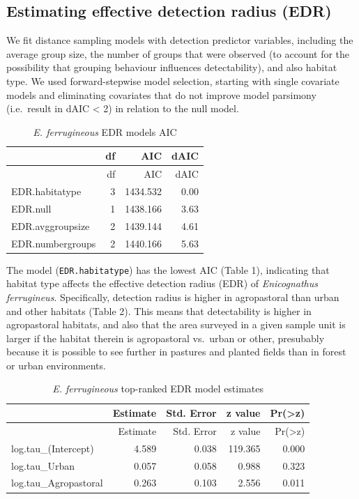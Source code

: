 \documentclass[]{article}
\begin{document}
\subsection{Estimating effective detection radius
(EDR)}\label{estimating-effective-detection-radius-edr}

We fit distance sampling models with detection predictor variables,
including the average group size, the number of groups that were
observed (to account for the possibility that grouping behaviour
influences detectability), and also habitat type. We used
forward-stepwise model selection, starting with single covariate models
and eliminating covariates that do not improve model parsimony
(i.e.~result in dAIC \textless{} 2) in relation to the null model.

\begin{longtable}[]{@{}lrrr@{}}
\caption{\textit{E. ferrugineous} EDR models AIC}\tabularnewline
\toprule
& df & AIC & dAIC\tabularnewline
\midrule
\endfirsthead
\toprule
& df & AIC & dAIC\tabularnewline
\midrule
\endhead
EDR.habitatype & 3 & 1434.532 & 0.00\tabularnewline
EDR.null & 1 & 1438.166 & 3.63\tabularnewline
EDR.avggroupsize & 2 & 1439.144 & 4.61\tabularnewline
EDR.numbergroups & 2 & 1440.166 & 5.63\tabularnewline
\bottomrule
\end{longtable}

The model (\texttt{EDR.habitatype}) has the lowest AIC (Table 1),
indicating that habitat type affects the effective detection radius
(EDR) of \emph{Enicognathus ferrugineus}. Specifically, detection radius
is higher in agropastoral than urban and other habitats (Table 2). This
means that detectability is higher in agropastoral habitats, and also
that the area surveyed in a given sample unit is larger if the habitat
therein is agropastoral vs.~urban or other, presubably because it is
possible to see further in pastures and planted fields than in forest or
urban environments.

\begin{longtable}[]{@{}lrrrr@{}}
\caption{\textit{E. ferrugineous} top-ranked EDR model
estimates}\tabularnewline
\toprule
& Estimate & Std. Error & z value &
Pr(\textgreater{}\textbar{}z\textbar{})\tabularnewline
\midrule
\endfirsthead
\toprule
& Estimate & Std. Error & z value &
Pr(\textgreater{}\textbar{}z\textbar{})\tabularnewline
\midrule
\endhead
log.tau\_(Intercept) & 4.589 & 0.038 & 119.365 & 0.000\tabularnewline
log.tau\_Urban & 0.057 & 0.058 & 0.988 & 0.323\tabularnewline
log.tau\_Agropastoral & 0.263 & 0.103 & 2.556 & 0.011\tabularnewline
\bottomrule
\end{longtable}
\end{document}
